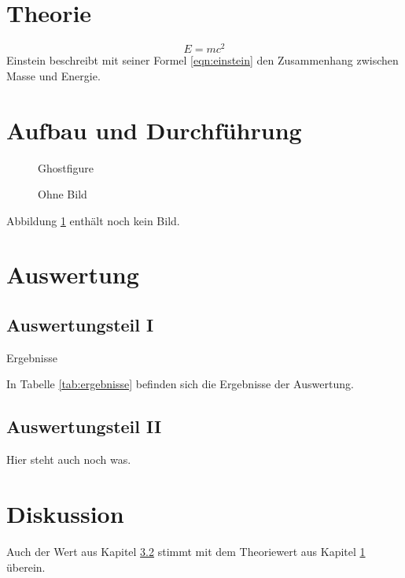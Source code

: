 \documentclass[titlepage=firstiscover]{scrartcl}
\begin{document}
\section{Theorie} \label{sec:Theorie}
  \begin{equation}
      E = mc^2 \label{eqn:einstein}
  \end{equation}
  Einstein beschreibt mit seiner Formel \eqref{eqn:einstein} den Zusammenhang zwischen Masse und Energie.
\section{Aufbau und Durchführung}
  \begin{figure}
    Ghostfigure
    \caption{Ohne Bild}
    \label{fig:nofigure}
  \end{figure}
  Abbildung \ref{fig:nofigure} enthält noch kein Bild.
\section{Auswertung}
\subsection{Auswertungsteil I}
  \begin{table}
    \caption{Ergebnisse}
    \label{tab:ergebnisse}
  \end{table}
  In Tabelle \ref{tab:ergebnisse} befinden sich die Ergebnisse der Auswertung.
\subsection{Auswertungsteil II} \label{sec:auswertung2}
  Hier steht auch noch was.
\section{Diskussion}
  Auch der Wert aus Kapitel \ref{sec:auswertung2} stimmt mit dem Theoriewert aus Kapitel \ref{sec:Theorie} überein.
\end{document}

